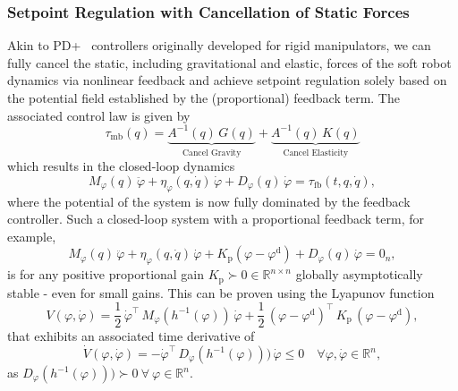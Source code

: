 \subsubsection{Setpoint Regulation with Cancellation of Static Forces}
Akin to PD+~\citep{kelly1996class, kelly1998global} controllers originally developed for rigid manipulators, we can fully cancel the static, including gravitational and elastic, forces of the soft robot dynamics via nonlinear feedback and achieve setpoint regulation solely based on the potential field established by the (proportional) feedback term. The associated control law is given by~\citep{patterson2024design, pustina2025analysis}
\begin{equation}
    \tau_\mathrm{mb}(q) =  \underbrace{A^{-1}(q) \, G(q)}_\text{Cancel Gravity} + \underbrace{A^{-1}(q) \, K(q)}_\text{Cancel Elasticity}
\end{equation}
which results in the closed-loop dynamics
\begin{equation}
    M_\varphi(q) \, \ddot{\varphi} + \eta_\varphi(q,\dot{q}) \, \dot{\varphi} + D_\varphi(q) \, \dot{\varphi} = \tau_\mathrm{fb}(t, q, \dot{q}),
\end{equation}
where the potential of the system is now fully dominated by the feedback controller.
Such a closed-loop system with a proportional feedback term, for example,
\begin{equation}
    M_\varphi(q) \, \ddot{\varphi} + \eta_\varphi(q,\dot{q}) \, \dot{\varphi} +  K_\mathrm{p} ( \varphi - \varphi^\mathrm{d}) + D_\varphi(q) \, \dot{\varphi} = 0_n,
\end{equation}
is for any positive proportional gain $K_\mathrm{p} \succ 0 \in \mathbb{R}^{n \times n}$ globally asymptotically stable - even for small gains.
This can be proven using the Lyapunov function
\begin{equation}
    V(\varphi,\dot{\varphi}) = \frac{1}{2} \, \dot{\varphi}^\top \, M_\varphi(h^{-1}(\varphi)) \, \dot{\varphi} + \frac{1}{2} \, \left (\varphi - \varphi^\mathrm{d} \right )^\top \, K_\mathrm{p} \, \left (\varphi - \varphi^\mathrm{d} \right ),
\end{equation}
that exhibits an associated time derivative of
\begin{equation}
    \dot{V}(\varphi, \dot{\varphi}) = - \dot{\varphi}^\top \, D_\varphi(h^{-1}(\varphi))) \, \dot{\varphi} \leq 0 \quad \forall \varphi, \dot{\varphi} \in \mathbb{R}^n,
\end{equation}
as $D_\varphi(h^{-1}(\varphi))) \succ 0 \: \forall \: \varphi \in \mathbb{R}^n$. 

